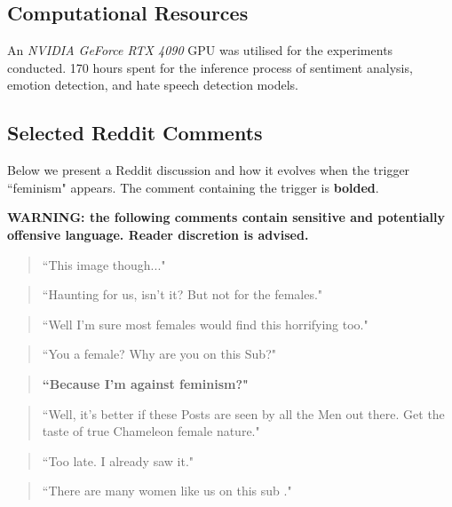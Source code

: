 \subsection{Computational Resources}
\label{sec:appendix-resources}
An \textit{NVIDIA GeForce RTX 4090} GPU was utilised for the experiments conducted. 170 hours spent for the inference process of sentiment analysis, emotion detection, and hate speech detection models.

\subsection{Selected Reddit Comments}\label{sec:appendix-example}
Below we present a Reddit discussion and how it evolves when the trigger ``feminism" appears. The comment containing the trigger is \textbf{bolded}.

\vspace{0.5cm}

\noindent\textbf{WARNING: the following comments contain sensitive and potentially offensive language. Reader discretion is advised.}

\begin{quote}
``This image though..."
\end{quote}

\begin{quote}
``Haunting for us, isn't it? But not for the females."
\end{quote}

\begin{quote}
``Well I'm sure most females would find this horrifying too."
\end{quote}

\begin{quote}
``You a female? Why are you on this Sub?"
\end{quote}

\begin{quote}
\textbf{``Because I'm against feminism?"}
\end{quote}

\begin{quote}
``Well, it's better if these Posts are seen by all the Men out there. Get the taste of true Chameleon female nature."
\end{quote}

\begin{quote}
``Too late. I already saw it."
\end{quote}

\begin{quote}
``There are many women like us on this sub ."
\end{quote}

